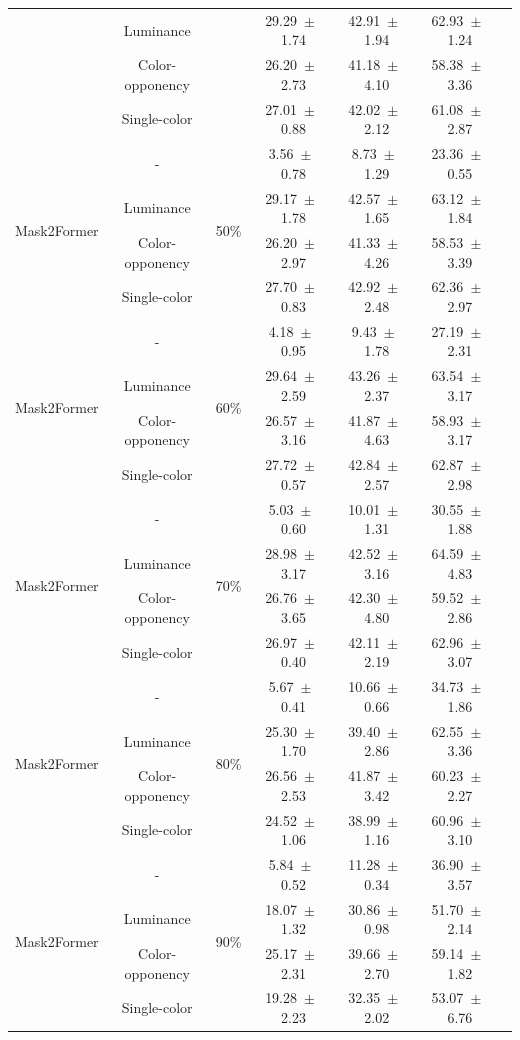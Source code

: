 \begin{table}[h]
\begin{tabular}{@{}lccc ccc@{}}
& Luminance & & 29.29~$\pm$~1.74 & 42.91~$\pm$~1.94 & 62.93~$\pm$~1.24 \\
& Color-opponency & & 26.20~$\pm$~2.73 & 41.18~$\pm$~4.10 & 58.38~$\pm$~3.36 \\
& Single-color & & 27.01~$\pm$~0.88 & 42.02~$\pm$~2.12 & 61.08~$\pm$~2.87 \\
\midrule
\multirow{4}{*}{Mask2Former} & - & \multirow{4}{*}{50\%} & 3.56~$\pm$~0.78 & 8.73~$\pm$~1.29 & 23.36~$\pm$~0.55 \\
& Luminance & & 29.17~$\pm$~1.78 & 42.57~$\pm$~1.65 & 63.12~$\pm$~1.84 \\
& Color-opponency & & 26.20~$\pm$~2.97 & 41.33~$\pm$~4.26 & 58.53~$\pm$~3.39 \\
& Single-color & & 27.70~$\pm$~0.83 & 42.92~$\pm$~2.48 & 62.36~$\pm$~2.97 \\
\midrule
\multirow{4}{*}{Mask2Former} & - & \multirow{4}{*}{60\%} & 4.18~$\pm$~0.95 & 9.43~$\pm$~1.78 & 27.19~$\pm$~2.31 \\
& Luminance & & 29.64~$\pm$~2.59 & 43.26~$\pm$~2.37 & 63.54~$\pm$~3.17 \\
& Color-opponency & & 26.57~$\pm$~3.16 & 41.87~$\pm$~4.63 & 58.93~$\pm$~3.17 \\
& Single-color & & 27.72~$\pm$~0.57 & 42.84~$\pm$~2.57 & 62.87~$\pm$~2.98 \\
\midrule
\multirow{4}{*}{Mask2Former} & - & \multirow{4}{*}{70\%} & 5.03~$\pm$~0.60 & 10.01~$\pm$~1.31 & 30.55~$\pm$~1.88 \\
& Luminance & & 28.98~$\pm$~3.17 & 42.52~$\pm$~3.16 & 64.59~$\pm$~4.83 \\
& Color-opponency & & 26.76~$\pm$~3.65 & 42.30~$\pm$~4.80 & 59.52~$\pm$~2.86 \\
& Single-color & & 26.97~$\pm$~0.40 & 42.11~$\pm$~2.19 & 62.96~$\pm$~3.07 \\
\midrule
\multirow{4}{*}{Mask2Former} & - & \multirow{4}{*}{80\%} & 5.67~$\pm$~0.41 & 10.66~$\pm$~0.66 & 34.73~$\pm$~1.86 \\
& Luminance & & 25.30~$\pm$~1.70 & 39.40~$\pm$~2.86 & 62.55~$\pm$~3.36 \\
& Color-opponency & & 26.56~$\pm$~2.53 & 41.87~$\pm$~3.42 & 60.23~$\pm$~2.27 \\
& Single-color & & 24.52~$\pm$~1.06 & 38.99~$\pm$~1.16 & 60.96~$\pm$~3.10 \\
\midrule
\multirow{4}{*}{Mask2Former} & - & \multirow{4}{*}{90\%} & 5.84~$\pm$~0.52 & 11.28~$\pm$~0.34 & 36.90~$\pm$~3.57 \\
& Luminance & & 18.07~$\pm$~1.32 & 30.86~$\pm$~0.98 & 51.70~$\pm$~2.14 \\
& Color-opponency & & 25.17~$\pm$~2.31 & 39.66~$\pm$~2.70 & 59.14~$\pm$~1.82 \\
& Single-color & & 19.28~$\pm$~2.23 & 32.35~$\pm$~2.02 & 53.07~$\pm$~6.76 \\
\midrule
\bottomrule
\end{tabular}
\label{tab:sparse_results_mask2former_acdc_night}
\end{table}